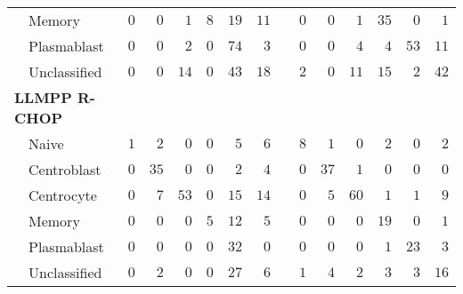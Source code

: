 \begin{table}[!tbp]
{\begin{center}
\begin{tabular}{lrrrrrrcrrrrrr}
~~Memory&$0$&$ 0$&$  1$&$8$&$19$&$11$&&$0$&$ 0$&$  1$&$35$&$ 0$&$ 1$\tabularnewline
~~Plasmablast&$0$&$ 0$&$  2$&$0$&$74$&$ 3$&&$0$&$ 0$&$  4$&$ 4$&$53$&$11$\tabularnewline
~~Unclassified&$0$&$ 0$&$ 14$&$0$&$43$&$18$&&$2$&$ 0$&$ 11$&$15$&$ 2$&$42$\tabularnewline
\hline
{\bfseries LLMPP R-CHOP}&&&&&&&&&&&&&\tabularnewline
~~Naive&$1$&$ 2$&$  0$&$0$&$ 5$&$ 6$&&$8$&$ 1$&$  0$&$ 2$&$ 0$&$ 2$\tabularnewline
~~Centroblast&$0$&$35$&$  0$&$0$&$ 2$&$ 4$&&$0$&$37$&$  1$&$ 0$&$ 0$&$ 0$\tabularnewline
~~Centrocyte&$0$&$ 7$&$ 53$&$0$&$15$&$14$&&$0$&$ 5$&$ 60$&$ 1$&$ 1$&$ 9$\tabularnewline
~~Memory&$0$&$ 0$&$  0$&$5$&$12$&$ 5$&&$0$&$ 0$&$  0$&$19$&$ 0$&$ 1$\tabularnewline
~~Plasmablast&$0$&$ 0$&$  0$&$0$&$32$&$ 0$&&$0$&$ 0$&$  0$&$ 1$&$23$&$ 3$\tabularnewline
~~Unclassified&$0$&$ 2$&$  0$&$0$&$27$&$ 6$&&$1$&$ 4$&$  2$&$ 3$&$ 3$&$16$\tabularnewline
\hline
\end{tabular}\end{center}}

\end{table}
